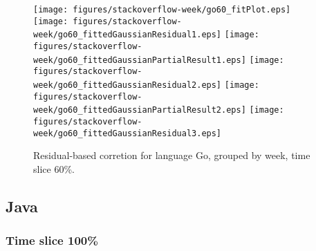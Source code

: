 \begin{figure}[t]
\centering
{}
{\texttt{[image: figures/stackoverflow-week/go60\_fitPlot.eps]}}
{\texttt{[image: figures/stackoverflow-week/go60\_fittedGaussianResidual1.eps]}}
{\texttt{[image: figures/stackoverflow-week/go60\_fittedGaussianPartialResult1.eps]}}
{\texttt{[image: figures/stackoverflow-week/go60\_fittedGaussianResidual2.eps]}}
{\texttt{[image: figures/stackoverflow-week/go60\_fittedGaussianPartialResult2.eps]}}
{\texttt{[image: figures/stackoverflow-week/go60\_fittedGaussianResidual3.eps]}}
\caption{Residual-based corretion for language Go, grouped by week, time slice 60\%.}
\end{figure}


\FloatBarrier


\subsection{Java}

\subsubsection{Time slice 100\%}

